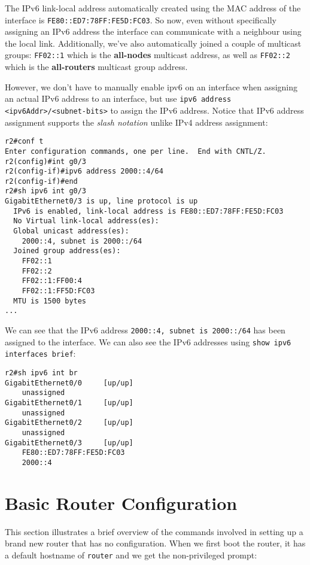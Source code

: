 \noindent
The IPv6 link-local address automatically created using the MAC address of the interface is \verb|FE80::ED7:78FF:FE5D:FC03|. So now, even without specifically assigning an IPv6 address the interface can communicate with a neighbour using the local link. Additionally, we've also automatically joined a couple of multicast groups: \verb|FF02::1| which is the \textbf{all-nodes} multicast address, as well as \verb|FF02::2| which is the \textbf{all-routers} multicast group address. 

However, we don't have to manually enable ipv6 on an interface when assigning an actual IPv6 address to an interface, but use \verb|ipv6 address <ipv6Addr>/<subnet-bits>| to assign the IPv6 address. Notice that IPv6 address assignment supports the \textit{slash notation} unlike IPv4 address assignment:

\vspace{-15pt}
\begin{verbatim}
r2#conf t
Enter configuration commands, one per line.  End with CNTL/Z.
r2(config)#int g0/3
r2(config-if)#ipv6 address 2000::4/64
r2(config-if)#end
r2#sh ipv6 int g0/3
GigabitEthernet0/3 is up, line protocol is up
  IPv6 is enabled, link-local address is FE80::ED7:78FF:FE5D:FC03
  No Virtual link-local address(es):
  Global unicast address(es):
    2000::4, subnet is 2000::/64
  Joined group address(es):
    FF02::1
    FF02::2
    FF02::1:FF00:4
    FF02::1:FF5D:FC03
  MTU is 1500 bytes
...
\end{verbatim}
\vspace{-10pt}

\noindent
We can see that the IPv6 address \verb|2000::4, subnet is 2000::/64| has been assigned to the interface. We can also see the IPv6 addresses using \verb|show ipv6 interfaces brief|:

\vspace{-15pt}
\begin{verbatim}
r2#sh ipv6 int br
GigabitEthernet0/0     [up/up]
    unassigned
GigabitEthernet0/1     [up/up]
    unassigned
GigabitEthernet0/2     [up/up]
    unassigned
GigabitEthernet0/3     [up/up]
    FE80::ED7:78FF:FE5D:FC03
    2000::4
\end{verbatim}

\section{Basic Router Configuration}
This section illustrates a brief overview of the commands involved in setting up a brand new router that has no configuration. When we first boot the router, it has a default hostname of \verb|router| and we get the non-privileged prompt:

